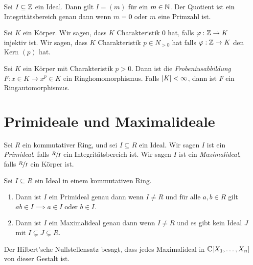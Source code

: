 \begin{lemma}
	Sei $I \subseteq \mathbb{Z}$ ein Ideal. Dann gilt $I = (m)$ für ein $m \in \mathbb{N}$. 
	Der Quotient ist ein Integritätsbereich genau dann wenn $m = 0$ oder $m$ eine Primzahl ist.
\end{lemma}


\begin{definition}
	Sei $K$ ein Körper. Wir sagen, dass $K$ Charakteristik $0$ hat, falls $\varphi: \mathbb{Z} \to K$ injektiv ist.
	Wir sagen, dass $K$ Charakteristik $p \in N_{> 0} $ hat falls $\varphi: \mathbb{Z} \to K$ den Kern $(p)$ hat.
\end{definition}


\begin{proposition}
	Sei $K$ ein Körper mit Charakteristik $p > 0$.
	Dann ist die \emph{Frobeniusabbildung} $F: x \in K \to x^{p} \in K$ ein Ringhomomorphismus.
	Falls $\abs{K} < \infty$, dann ist $F$ ein Ringautomorphismus.
\end{proposition}


\section{Primideale und Maximalideale}
\begin{definition}
	Sei $R$ ein kommutativer Ring, und sei $I \subseteq R$ ein Ideal.
	Wir sagen $I$ ist ein \emph{Primideal}, falls $\sfrac{R}{I}$ ein Integritätsbereich ist.
	Wir sagen $I$ ist ein \emph{Maximalideal}, falls $\sfrac{R}{I}$ ein Körper ist.
\end{definition}

\begin{proposition}
	Sei $I \subseteq R$ ein Ideal in einem kommutativen Ring.
	\begin{enumerate}[1)]
		\item Dann ist $I$ ein Primideal genau dann wenn $I \neq R$ und für alle $a,b \in R$ gilt $ab \in I \implies a \in I $ oder $b \in I$.
		\item Dann ist $I$ ein Maximalideal genau dann wenn $I \neq R$ und es gibt kein Ideal $J$ mit $I \subsetneq J \subsetneq R$.
	\end{enumerate}
\end{proposition}




\begin{remark}
	Der Hilbert'sche Nullstellensatz besagt, dass jedes Maximalideal in $\mathbb{C}[X_1,\ldots,X_{n}]$ von dieser Gestalt ist.
\end{remark}

